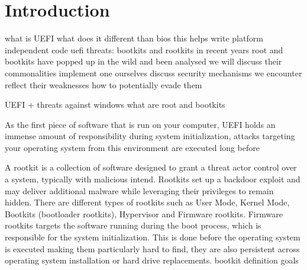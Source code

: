 

\chapter{Introduction}


what is UEFI
what does it different than bios
this helps write platform independent code
uefi threats:
bootkits and rootkits
in recent years root and bootkits have popped up in the wild and been analysed
we will discuss their commonalities
implement one ourselves
discuss security mechanisms we encounter
reflect their weaknesses
how to potentially evade them

UEFI + threats against windows
what are root and bootkits

As the first piece of software that is run on your computer, UEFI holds an immense amount of responsibility during system initialization, attacks targeting your operating system from this environment are executed long before


A rootkit is a collection of software designed to grant a threat actor control over a system, typically with malicious intend.
Rootkits set up a backdoor exploit and may deliver additional malware while leveraging their privileges to remain hidden.
There are different types of rootkits such as User Mode, Kernel Mode, Bootkits (bootloader rootkits), Hypervisor and Firmware rootkits.
\cite{crowdstrike, techtarget}
Firmware rootkits targets the software running during the boot process, which is responsible for the system initialization. This is done before the operating system is executed making them particularly hard to find, they are also persistent across operating system installation or hard drive replacements.
\cite{crowdstrike}
bootkit definition
goals


